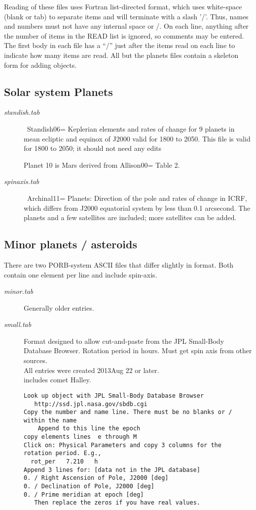 \documentclass{article}
\newcommand{\qcite}[1]{#1=\cite{#1}}  %
\newcommand{\qii}{\\ \hspace*{4.em}}     %
\begin{document}
Reading of these files uses Fortran list-directed format, which uses white-space (blank or tab)
to separate items and will terminate with a slash '/'. Thus, names and numbers
must not have any internal space or /.  On each line, anything after the number
of items in the READ list is ignored, so comments may be entered. The first body in each file has a ``/'' just after the items read on each line to indicate how many items are read. All but the planets files contain a skeleton form for adding objects.

\subsection{Solar system Planets} 

\begin{description} 
 \item [\textit{standish.tab}] \ \qcite{Standish06} Keplerian elements and rates of change for 9 planets in mean ecliptic and equinox of J2000 valid for 1800 to 2050.
This file is valid for 1800 to 2050; it should not need any edits

Planet 10 is Mars derived from \qcite{Allison00} Table 2. 

 \item [\textit{spinaxis.tab}] \ \qcite{Archinal11} Planets: Direction of the pole and rates of change in ICRF, which differs from J2000 equatorial system by less than 0.1 arcsecond. The planets and a few satellites are included; more satellites can be added.
\end{description}
\subsection{Minor planets / asteroids }

There are two PORB-system ASCII files that differ slightly in format. Both
contain one element per line and include spin-axis.

\begin{description} 
 \item [\textit{minor.tab}] Generally older entries.

 \item [\textit{small.tab}]  Format designed to allow cut-and-paste from the JPL Small-Body Database 
Browser. Rotation period in hours. Must get spin axis from other sources.
\\ All entries were created 2013Aug 22 or later.
\qii includes comet Halley.
\begin{verbatim}
Look up object with JPL Small-Body Database Browser  
   http://ssd.jpl.nasa.gov/sbdb.cgi
Copy the number and name line. There must be no blanks or / within the name
    Append to this line the epoch
copy elements lines  e through M
Click on: Physical Parameters and copy 3 columns for the rotation period. E.g.,
  rot_per 	7.210 	h
Append 3 lines for: [data not in the JPL database]
0. / Right Ascension of Pole, J2000 [deg]   
0. / Declination of Pole, J2000 [deg]
0. / Prime meridian at epoch [deg]
   Then replace the zeros if you have real values.
\end{verbatim}

\end{description}
\end{document}
